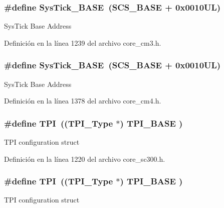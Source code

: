 \subsubsection[{\texorpdfstring{Sys\+Tick\+\_\+\+B\+A\+SE}{SysTick_BASE}}]{\setlength{\rightskip}{0pt plus 5cm}\#define Sys\+Tick\+\_\+\+B\+A\+SE~({\bf S\+C\+S\+\_\+\+B\+A\+SE} +  0x0010\+U\+L)}\hypertarget{group___c_m_s_i_s__core__base_ga58effaac0b93006b756d33209e814646}{}\label{group___c_m_s_i_s__core__base_ga58effaac0b93006b756d33209e814646}
Sys\+Tick Base Address 

Definición en la línea 1239 del archivo core\+\_\+cm3.\+h.

\subsubsection[{\texorpdfstring{Sys\+Tick\+\_\+\+B\+A\+SE}{SysTick_BASE}}]{\setlength{\rightskip}{0pt plus 5cm}\#define Sys\+Tick\+\_\+\+B\+A\+SE~({\bf S\+C\+S\+\_\+\+B\+A\+SE} +  0x0010\+U\+L)}\hypertarget{group___c_m_s_i_s__core__base_ga58effaac0b93006b756d33209e814646}{}\label{group___c_m_s_i_s__core__base_ga58effaac0b93006b756d33209e814646}
Sys\+Tick Base Address 

Definición en la línea 1378 del archivo core\+\_\+cm4.\+h.

\subsubsection[{\texorpdfstring{T\+PI}{TPI}}]{\setlength{\rightskip}{0pt plus 5cm}\#define T\+PI~(({\bf T\+P\+I\+\_\+\+Type}       $\ast$)     {\bf T\+P\+I\+\_\+\+B\+A\+SE}      )}\hypertarget{group___c_m_s_i_s__core__base_ga8b4dd00016aed25a0ea54e9a9acd1239}{}\label{group___c_m_s_i_s__core__base_ga8b4dd00016aed25a0ea54e9a9acd1239}
T\+PI configuration struct 

Definición en la línea 1220 del archivo core\+\_\+sc300.\+h.

\subsubsection[{\texorpdfstring{T\+PI}{TPI}}]{\setlength{\rightskip}{0pt plus 5cm}\#define T\+PI~(({\bf T\+P\+I\+\_\+\+Type}       $\ast$)     {\bf T\+P\+I\+\_\+\+B\+A\+SE}      )}\hypertarget{group___c_m_s_i_s__core__base_ga8b4dd00016aed25a0ea54e9a9acd1239}{}\label{group___c_m_s_i_s__core__base_ga8b4dd00016aed25a0ea54e9a9acd1239}
T\+PI configuration struct 

